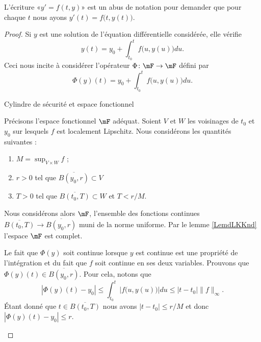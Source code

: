 \begin{remark}
    L'écriture «\( y'=f(t,y)\)» est un abus de notation pour demander que pour chaque \( t\) nous ayons \( y'(t)=f\big(t,y(t)\big)\).
\end{remark}

\begin{proof}
    Si \( y\) est une solution de l'équation différentielle considérée, elle vérifie
    \begin{equation}        \label{EqPGLwcL}
        y(t)=y_0+\int_{t_0}^tf\big( u,y(u) \big)du.
    \end{equation}
    Ceci nous incite à considérer l'opérateur \( \Phi\colon \mF\to \mF\) défini par
    \begin{equation}
        \Phi(y)(t)=y_0+\int_{t_0}^tf\big( u,y(u) \big)du.
    \end{equation}

    \begin{subproof}
    \item[Cylindre de sécurité et espace fonctionnel]

    Précisons l'espace fonctionnel \( \mF\) adéquat. Soient \( V\) et \( W\) les voisinages de \( t_0\) et \( y_0\) sur lesquels \( f\) est localement Lipschitz. Nous considérons les quantités suivantes :
    \begin{enumerate}
        \item
            \( M=\sup_{V\times W}f\) ;
        \item
            \( r>0\) tel que \( \overline{ B(y_0,r) }\subset V\)
        \item
            \( T>0\) tel que \( \overline{ B(t_0,T) }\subset W\) et \( T<r/M\).
    \end{enumerate}
    Nous considérons alors \( \mF\), l'ensemble des fonctions continues \( \overline{ B(t_0,T) }\to \overline{ B(y_0,r) }\) muni de la norme uniforme. Par le lemme \ref{LemdLKKnd} l'espace \( \mF\) est complet.

    Le fait que \( \Phi(y)\) soit continue lorsque \( y\) est continue est une propriété de l'intégration et du fait que \( f\) soit continue en ses deux variables. Prouvons que \( \Phi(y)(t)\in\overline{ B(y_0,r) }\). Pour cela, notons que
    \begin{equation}
        | \Phi(y)(t)-y_0 |\leq \int_{t_0}^t |f\big( u,y(u) \big)|du\leq | t-t_0 |\| f \|_{\infty}.
    \end{equation}
    Étant donné que \( t\in\overline{ B(t_0,T) }\) nous avons \( | t-t_0 |\leq r/M\) et donc \( | \Phi(y)(t)-y_0 |\leq r\).


\end{subproof}
\end{proof}
